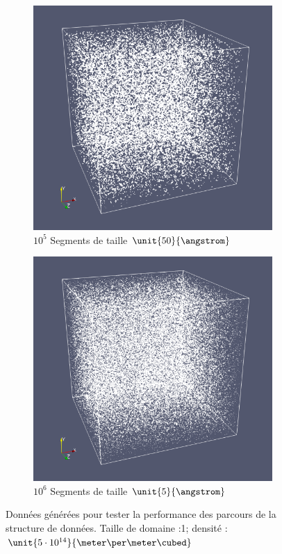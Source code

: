 \begin{figure}
	\centering
	\begin{subfigure}{0.4\textwidth}
		\centering
		\includegraphics[width=\linewidth]{img/testcase-bench-mesh-1E5}
		\caption{$10^5$ Segments de taille $\unit{50}{\angstrom}$}
		\label{fig:testcase-bench-mesh-1E5}
	\end{subfigure}
	\begin{subfigure}{0.4\textwidth}
		\centering
		\includegraphics[width=\linewidth]{img/testcase-bench-mesh-1E6}
		\caption{$10^6$ Segments de taille $\unit{5}{\angstrom}$}
		\label{fig:testcase-bench-mesh-1E6}
	\end{subfigure}	
	\caption{Données générées pour tester la performance des parcours de la structure de données. Taille de domaine :\unit{1}{\micro\meter}; densité : $\unit{5\cdot 10^{14}}{\meter\per\meter\cubed}$ }
	\label{fig:testcase-bench-mesh}
\end{figure}

